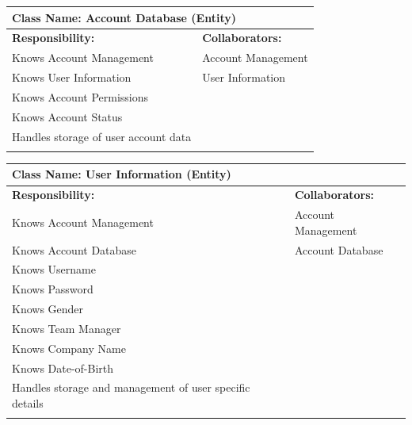 \documentclass[]{article}
\begin{document}
\begin{itemize}
	\begin{table}[ht]
		\centering
		\begin{tabular}{|p{7cm}|p{7cm}|}
		\hline 
		 \multicolumn{2}{|l|}{\textbf{Class Name:} Account Database (Entity)} \\
		\hline
		\textbf{Responsibility:} & \textbf{Collaborators:} \\
		\hline
			Knows Account Management & Account Management \\
			Knows User Information & User Information \\
			Knows Account Permissions &\\
			Knows Account Status &\\
			Handles storage of user account data &\\
		\vspace{0.1in} & \\
		\hline
		\end{tabular}
	\end{table}

	\begin{table}[ht]
		\centering
		\begin{tabular}{|p{7cm}|p{7cm}|}
		\hline 
		 \multicolumn{2}{|l|}{\textbf{Class Name:} User Information (Entity)} \\
		\hline
		\textbf{Responsibility:} & \textbf{Collaborators:} \\
		\hline

			Knows Account Management & Account Management \\
			Knows Account Database & Account Database \\
			Knows Username &\\
			Knows Password &\\
			Knows Gender &\\
			Knows Team Manager &\\
			Knows Company Name &\\
			Knows Date-of-Birth &\\
			Handles storage and management of user specific details &\\
		\vspace{0.1in} & \\
		\hline
		\end{tabular}
	\end{table}


\end{itemize}
\end{document}
